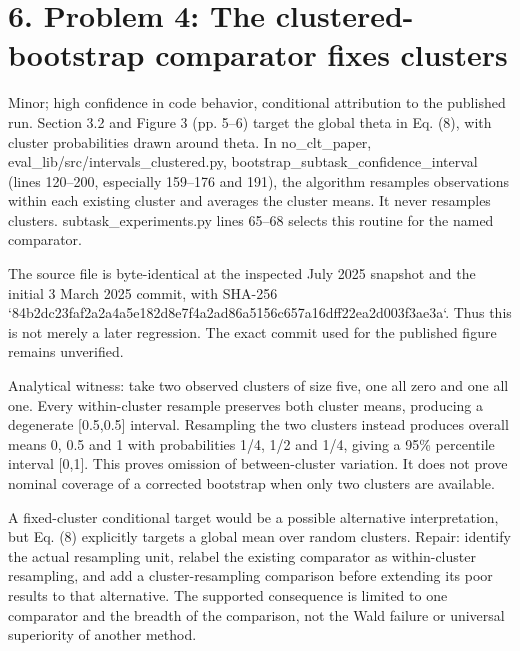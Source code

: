 \documentclass[10pt]{article}
\begin{document}
\section*{6. Problem 4: The clustered-bootstrap comparator fixes clusters}
Minor; high confidence in code behavior, conditional attribution to the published run. Section 3.2 and Figure 3 (pp. 5–6) target the global theta in Eq. (8), with cluster probabilities drawn around theta. In no\_clt\_paper, eval\_lib/src/intervals\_clustered.py, bootstrap\_subtask\_confidence\_interval (lines 120–200, especially 159–176 and 191), the algorithm resamples observations within each existing cluster and averages the cluster means. It never resamples clusters. subtask\_experiments.py lines 65–68 selects this routine for the named comparator.\par
The source file is byte-identical at the inspected July 2025 snapshot and the initial 3 March 2025 commit, with SHA-256 `84b2dc23faf2a2a4a5e182d8e7f4a2ad86a5156c657a16dff22ea2d003f3ae3a`. Thus this is not merely a later regression. The exact commit used for the published figure remains unverified.\par
Analytical witness: take two observed clusters of size five, one all zero and one all one. Every within-cluster resample preserves both cluster means, producing a degenerate [0.5,0.5] interval. Resampling the two clusters instead produces overall means 0, 0.5 and 1 with probabilities 1/4, 1/2 and 1/4, giving a 95\% percentile interval [0,1]. This proves omission of between-cluster variation. It does not prove nominal coverage of a corrected bootstrap when only two clusters are available.\par
A fixed-cluster conditional target would be a possible alternative interpretation, but Eq. (8) explicitly targets a global mean over random clusters. Repair: identify the actual resampling unit, relabel the existing comparator as within-cluster resampling, and add a cluster-resampling comparison before extending its poor results to that alternative. The supported consequence is limited to one comparator and the breadth of the comparison, not the Wald failure or universal superiority of another method.\par
\end{document}
